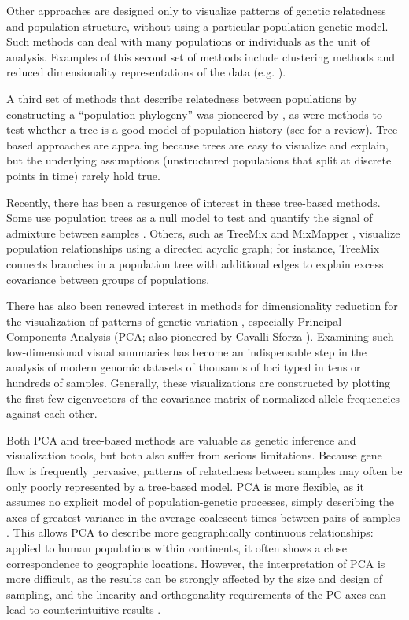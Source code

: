 \documentclass[10pt,letterpaper]{article}
\begin{document}
Other approaches are designed only to visualize patterns of genetic relatedness and population structure,
without using a particular population genetic model.
Such methods can deal with many populations or individuals as the unit of analysis. 
Examples of this second set of methods include clustering methods \cite{STRUCTURE, ADMIXTURE, FINESTRUCTURE} 
and reduced dimensionality representations of the data (e.g. \cite{cavallisforza1994, Patterson2006, price2006eigenstrat}).  

A third set of methods that describe relatedness between populations by constructing a ``population phylogeny''
was pioneered by \cite{cavallisforza_edwards1967}, 
as were methods to test whether a tree is a good model of population history \cite{CavalliSforza1975} (see \cite{Felsenstein1982} for a review).
Tree-based approaches are appealing because trees are easy to visualize and explain,
but the underlying assumptions (unstructured populations that split at discrete points in time)
rarely hold true.
 
Recently, there has been a resurgence of interest in these tree-based methods.  
Some use population trees as a null model to test and quantify the signal of admixture between samples \cite{reich_india_2009}.  
Others, such as TreeMix \cite{Treemix} and MixMapper \cite{lipson_mixmapper_2013}, 
visualize population relationships using a directed acyclic graph;
for instance, TreeMix connects branches in a population tree with additional edges
to explain excess covariance between groups of populations.

There has also been renewed interest in methods for dimensionality reduction
for the visualization of patterns of genetic variation \cite{Patterson2006},
especially Principal Components Analysis
(PCA; also pioneered by Cavalli-Sforza \cite{menozzi1978synthetic}). 
Examining such low-dimensional visual summaries has become an indispensable step in
the analysis of modern genomic datasets of thousands of loci typed in tens or hundreds of samples.
Generally, these visualizations are constructed by plotting the first few eigenvectors of the covariance matrix
of normalized allele frequencies against each other.

Both PCA and tree-based methods are valuable as genetic inference and visualization tools, but both also suffer from serious limitations.  
Because gene flow is frequently pervasive, patterns of relatedness between samples may often be only poorly represented by a tree-based model.  
PCA is more flexible, as it assumes no explicit model of population-genetic processes, 
simply describing the axes of greatest variance in the average coalescent times between pairs of samples \cite{mcvean_genealogical_2009}. 
This allows PCA to describe more geographically continuous relationships: 
applied to human populations within continents, it often shows a close correspondence to geographic locations\cite{novembre_genes_2008,wang_quantitative_2012}.  
However, the interpretation of PCA is more difficult, as the results can be strongly affected by the size and design of sampling, 
and the linearity and orthogonality requirements of the PC axes can lead to counterintuitive results \cite{novembre_interpreting_2008, Francois_2010_surfing, Frichot2012}.
\end{document}

